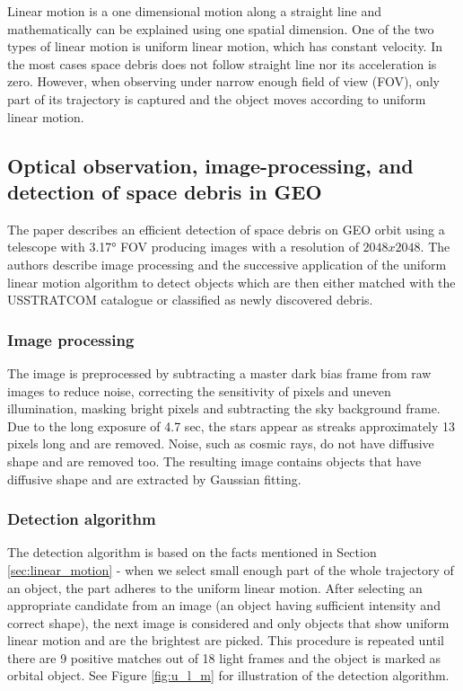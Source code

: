 	Linear motion is a one dimensional motion along a straight line and mathematically can be explained using one spatial dimension. One of the two types of linear motion is uniform linear motion, which has constant velocity. In the most cases space debris does not follow straight line nor its acceleration is zero. However, when observing under narrow enough field of view (FOV), only part of its trajectory is captured and the object moves according to uniform linear motion.

\subsection{Optical observation, image-processing, and detection of space debris in GEO}\label{subsec:linear_geo}

	The paper describes an efficient detection of space debris on GEO orbit using a telescope with 3.17° FOV producing images with a resolution of $2048 x 2048$. The authors describe image processing and the successive application of the uniform linear motion algorithm to detect objects which are then either matched with the USSTRATCOM catalogue or classified as newly discovered debris.
	
\subsubsection{Image processing}

	The image is preprocessed by subtracting a master dark bias frame from raw images to reduce noise, correcting the sensitivity of pixels and uneven illumination, masking bright pixels and subtracting the sky background frame. Due to the long exposure of 4.7 sec, the stars appear as streaks approximately 13 pixels long and are removed. Noise, such as cosmic rays, do not have diffusive shape and are removed too. The resulting image contains objects that have diffusive shape and are extracted by Gaussian fitting.
	
\subsubsection{Detection algorithm}

	The detection algorithm is based on the facts mentioned in Section \ref{sec:linear_motion} - when we select small enough part of the whole trajectory of an object, the part adheres to the uniform linear motion. After selecting an appropriate candidate from an image (an object having sufficient intensity and correct shape), the next image is considered and only objects that show uniform linear motion and are the brightest are picked. This procedure is repeated until there are 9 positive matches out of 18 light frames and the object is marked as orbital object. See Figure \ref{fig:u_l_m} for illustration of the detection algorithm.
	

